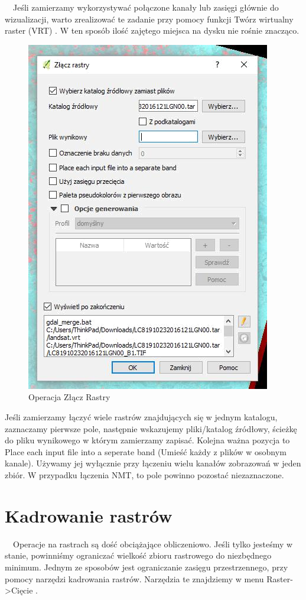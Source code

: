 \documentclass[12pt,a4paper]{book}
\begin{document}
\ \ Jeśli zamierzamy wykorzystywać połączone kanały lub zasięgi głównie do wizualizacji, warto zrealizować te zadanie przy pomocy funkcji  Twórz wirtualny raster (VRT) . W ten sposób ilość zajętego miejsca na dysku nie rośnie znacząco.



\begin{center}
\begin{figure}
\includegraphics[width=10.689cm,height=15.402cm]{004-zlacz-rastry.png}
\caption{Operacja Złącz Rastry}
\end{figure}
\end{center}
Jeśli zamierzamy łączyć wiele rastrów znajdujących się w jednym katalogu, zaznaczamy pierwsze pole, następnie wskazujemy pliki/katalog źródłowy, ścieżkę do pliku wynikowego w którym zamierzamy zapisać. Kolejna ważna pozycja to  Place each input file into a seperate band  (Umieść każdy z plików w osobnym kanale). Używamy jej wyłącznie przy łączeniu wielu kanałów zobrazowań w jeden zbiór. W przypadku łączenia NMT, to pole powinno pozostać niezaznaczone.

\section{Kadrowanie rastrów}
\ \ Operacje na rastrach są dość obciążające obliczeniowo. Jeśli tylko jesteśmy w stanie, powinniśmy ograniczać wielkość zbioru rastrowego do niezbędnego minimum. Jednym ze sposobów jest ograniczanie zasięgu przestrzennego, przy pomocy narzędzi kadrowania rastrów. Narzędzia te znajdziemy w menu  Raster-{\textgreater}Cięcie .
\end{document}
